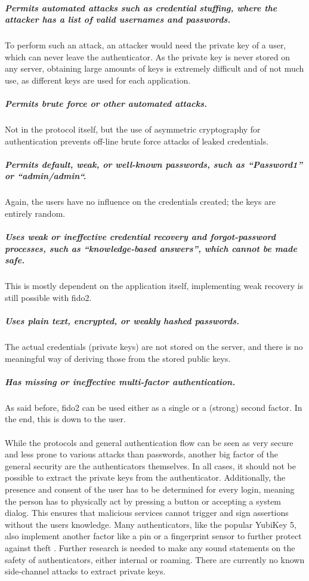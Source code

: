 \subparagraph{Permits automated attacks such as credential stuffing, where the attacker has a list of valid usernames and passwords.} To perform such an attack, an attacker would need the private key of a user, which can never leave the authenticator. As the private key is never stored on any server, obtaining large amounts of keys is extremely difficult and of not much use, as different keys are used for each application.

\subparagraph{Permits brute force or other automated attacks.} Not in the protocol itself, but the use of asymmetric cryptography for authentication prevents off-line brute force attacks of leaked credentials.

\subparagraph{Permits default, weak, or well-known passwords, such as “Password1” or “admin/admin“.} Again, the users have no influence on the credentials created; the keys are entirely random.

\subparagraph{Uses weak or ineffective credential recovery and forgot-password processes, such as “knowledge-based answers”, which cannot be made safe.} This is mostly dependent on the application itself, implementing weak recovery is still possible with \ac{fido2}.

\subparagraph{Uses plain text, encrypted, or weakly hashed passwords.} The actual credentials (private keys) are not stored on the server, and there is no meaningful way of deriving those from the stored public keys.

\subparagraph{Has missing or ineffective multi-factor authentication.} As said before, \ac{fido2} can be used either as a single or a (strong) second factor. In the end, this is down to the user.\\
\\
\noindent While the protocols and general authentication flow can be seen as very secure and less prone to various attacks than passwords, another big factor of the general security are the authenticators themselves. In all cases, it should not be possible to extract the private keys from the authenticator. Additionally, the presence and consent of the user has to be determined for every login, meaning the person has to physically act by pressing a button or accepting a system dialog. This ensures that malicious services cannot trigger and sign assertions without the users knowledge. Many authenticators, like the popular YubiKey 5, also implement another factor like a \ac{pin} or a fingerprint sensor to further protect against theft \cite{yubikey_5_nfc,dunkelberger2018}.
Further research is needed to make any sound statements on the safety of authenticators, either internal or roaming. There are currently no known side-channel attacks to extract private keys.\\


